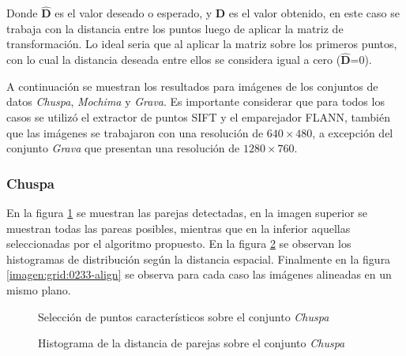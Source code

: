Donde $\hat{\mathbf{D}}$ es el valor deseado o esperado, y $\mathbf{D}$ es el valor obtenido, en este caso se trabaja con la distancia entre los puntos luego de aplicar la matriz de transformación. Lo ideal seria que al aplicar la matriz sobre los primeros puntos, con lo cual la distancia deseada entre ellos se considera igual a cero ($\hat{\mathbf{D}}$=0).

A continuación se muestran los resultados para imágenes de los conjuntos de datos \textit{Chuspa}, \textit{Mochima} y \textit{Grava}. Es importante considerar que para todos los casos se utilizó el extractor de puntos SIFT y el emparejador FLANN, también que las imágenes se trabajaron con una resolución de $640 \times 480$, a excepción del conjunto \textit{Grava} que presentan una resolución de $1280 \times 760$.

\subsubsection*{Chuspa}

En la figura \ref{imagen:grid:0233-match} se muestran las parejas detectadas, en la imagen superior se muestran todas las pareas posibles, mientras que en la inferior aquellas seleccionadas por el algoritmo propuesto. En la figura \ref{imagen:grid:0233-hist} se observan los histogramas de distribución según la distancia espacial. Finalmente en la figura \ref{imagen:grid:0233-align} se observa para cada caso las imágenes alineadas en un mismo plano.

\begin{figure}[h]
	\centering     %
	\hspace{1mm}%
	
	\caption[Selección de puntos caracteristicos sobre el conjunto \textit{Chuspa}]{Selección de puntos característicos sobre el conjunto \textit{Chuspa}}
	\label{imagen:grid:0233-match}
\end{figure}

\begin{figure}[h]
	\centering     %
	\hspace{3mm}%
	
	\caption[Histograma de la distancia de parejas sobre el conjunto \textit{Chuspa}]{Histograma de la distancia de parejas sobre el conjunto \textit{Chuspa}}
	\label{imagen:grid:0233-hist}
\end{figure}

